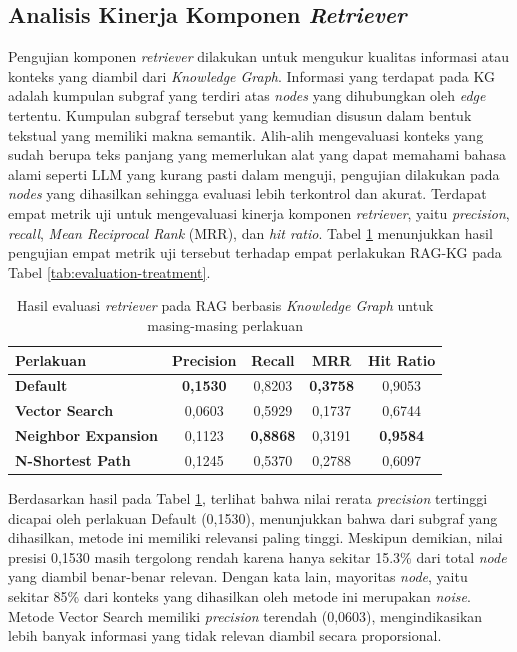 \subsection{Analisis Kinerja Komponen \textit{Retriever}}

Pengujian komponen \textit{retriever} dilakukan untuk mengukur kualitas informasi atau konteks yang diambil dari \textit{Knowledge Graph}.
Informasi yang terdapat pada KG adalah kumpulan subgraf yang terdiri atas \textit{nodes} yang dihubungkan oleh \textit{edge} tertentu.
Kumpulan subgraf tersebut yang kemudian disusun dalam bentuk tekstual yang memiliki makna semantik.
Alih-alih mengevaluasi konteks yang sudah berupa teks panjang yang memerlukan alat yang dapat memahami bahasa alami seperti LLM yang kurang pasti dalam menguji, pengujian dilakukan pada \textit{nodes} yang dihasilkan sehingga evaluasi lebih terkontrol dan akurat.
Terdapat empat metrik uji untuk mengevaluasi kinerja komponen \textit{retriever}, yaitu \textit{precision}, \textit{recall}, \textit{Mean Reciprocal Rank} (MRR), dan \textit{hit ratio}.
Tabel \ref{tab:retrieval-evaluation-result} menunjukkan hasil pengujian empat metrik uji tersebut terhadap empat perlakukan RAG-KG pada Tabel \ref{tab:evaluation-treatment}.

\begin{table}[H]
	\centering
	\caption{Hasil evaluasi \textit{retriever} pada RAG berbasis \textit{Knowledge Graph} untuk masing-masing perlakuan}
	\label{tab:retrieval-evaluation-result}
	\begin{tabular}{|l|c|c|c|c|}
		\hline
		\textbf{Perlakuan}          & \textbf{Precision} & \textbf{Recall} & \textbf{MRR}    & \textbf{Hit Ratio} \\
		\hline \hline
		\textbf{Default}            & \textbf{0,1530}    & 0,8203          & \textbf{0,3758} & 0,9053             \\
		\hline
		\textbf{Vector Search}      & 0,0603             & 0,5929          & 0,1737          & 0,6744             \\
		\hline
		\textbf{Neighbor Expansion} & 0,1123             & \textbf{0,8868} & 0,3191          & \textbf{0,9584}    \\
		\hline
		\textbf{N-Shortest Path}    & 0,1245             & 0,5370          & 0,2788          & 0,6097             \\
		\hline
	\end{tabular}
\end{table}
\pagebreak

Berdasarkan hasil pada Tabel \ref{tab:retrieval-evaluation-result}, terlihat bahwa nilai rerata \textit{precision} tertinggi dicapai oleh perlakuan Default (0,1530), menunjukkan bahwa dari subgraf yang dihasilkan, metode ini memiliki relevansi paling tinggi.
Meskipun demikian, nilai presisi 0,1530 masih tergolong rendah karena hanya sekitar 15.3\% dari total \textit{node} yang diambil benar-benar relevan.
Dengan kata lain, mayoritas \textit{node}, yaitu sekitar 85\% dari konteks yang dihasilkan oleh metode ini merupakan \textit{noise}.
Metode Vector Search memiliki \textit{precision} terendah (0,0603), mengindikasikan lebih banyak informasi yang tidak relevan diambil secara proporsional.

